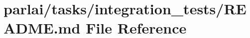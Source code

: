 \hypertarget{parlai_2tasks_2integration__tests_2README_8md}{}\section{parlai/tasks/integration\+\_\+tests/\+R\+E\+A\+D\+ME.md File Reference}
\label{parlai_2tasks_2integration__tests_2README_8md}

